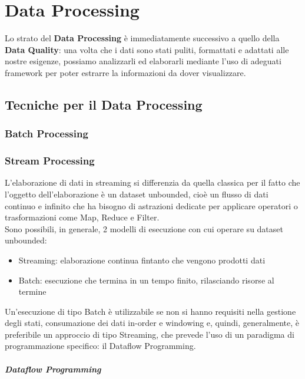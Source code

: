 \chapter{Data Processing}

Lo strato del \textbf{Data Processing} è immediatamente successivo a quello della \textbf{Data Quality}: una volta che i dati sono stati puliti, formattati e adattati alle nostre esigenze, possiamo analizzarli ed elaborarli mediante l'uso di adeguati framework per poter estrarre la informazioni da dover visualizzare.\\

\section{Tecniche per il Data Processing}

\subsection{Batch Processing}

\subsection{Stream Processing} \label{StreamProc}

L'elaborazione di dati in streaming si differenzia da quella classica per il fatto che l'oggetto dell'elaborazione è un dataset unbounded, cioè un flusso di dati continuo e infinito che ha bisogno di astrazioni dedicate per applicare operatori o trasformazioni come Map, Reduce e Filter. \\

Sono possibili, in generale, 2 modelli di esecuzione con cui operare su dataset unbounded:

\begin{itemize}
    \item Streaming: elaborazione continua fintanto che vengono prodotti dati
    \item Batch: esecuzione che termina in un tempo finito, rilasciando risorse al termine
\end{itemize}

Un'esecuzione di tipo Batch è utilizzabile se non si hanno requisiti nella gestione degli stati, consumazione dei dati in-order e windowing e, quindi, generalmente, è preferibile un approccio di tipo Streaming, che prevede l'uso di un paradigma di programmazione specifico: il Dataflow Programming.

\paragraph{Dataflow Programming}  \label{DataflowProg} ~\\

